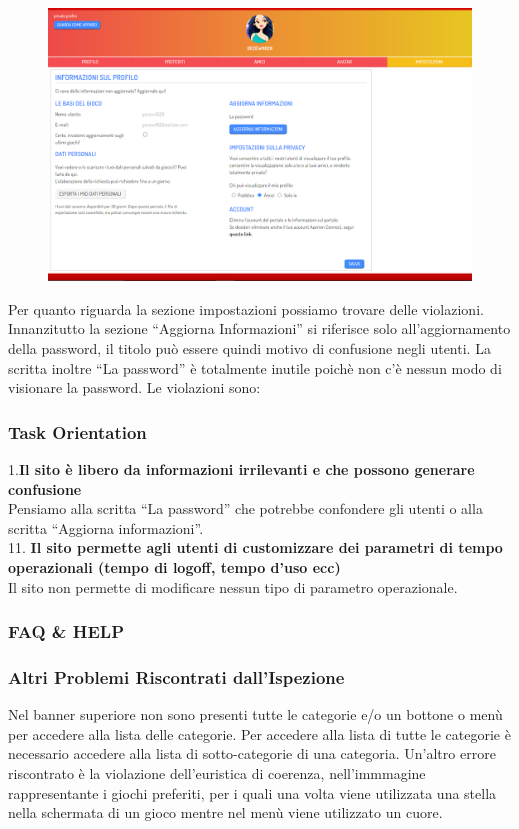 \documentclass[../Report.tex]{subfiles}
\begin{document}
    \begin{figure}[H]
        \includegraphics[width=\linewidth]{Assestment17.png}
        \centering
    \end{figure}

    Per quanto riguarda la sezione impostazioni possiamo trovare delle violazioni.
    Innanzitutto la sezione “Aggiorna Informazioni” si riferisce solo all’aggiornamento della password, il titolo può essere quindi motivo di confusione negli utenti. La scritta inoltre “La password” è totalmente inutile poichè non c’è nessun modo di visionare la password.
    Le violazioni sono:

    \subsubsection{Task Orientation}
    1.\textbf{Il sito è libero da informazioni irrilevanti e che possono generare confusione}\\
	Pensiamo alla scritta “La password” che potrebbe confondere gli utenti o alla scritta “Aggiorna informazioni”.\\
    
    11.\textbf{  Il sito permette agli utenti di customizzare dei parametri di tempo operazionali (tempo di logoff, tempo d’uso ecc)}\\
    Il sito non permette di modificare nessun tipo di parametro operazionale. \\

    \subsubsection{FAQ & HELP}
    
    \subsubsection{Altri Problemi Riscontrati dall’Ispezione}
    Nel banner superiore non sono presenti tutte le categorie e/o un bottone o menù per accedere alla lista delle categorie. Per accedere alla lista di tutte le categorie è necessario accedere alla lista di sotto-categorie di una categoria. 
    Un’altro errore riscontrato è la violazione dell’euristica di coerenza, nell’immmagine rappresentante i giochi preferiti, per i quali una volta viene utilizzata una stella nella schermata di un gioco mentre nel menù viene utilizzato un cuore.
\end{document}
